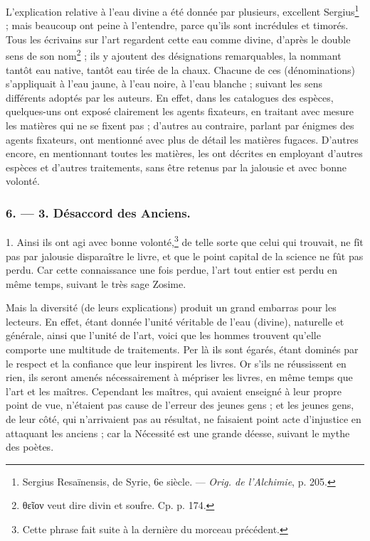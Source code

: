 \documentclass[a4paper, 11pt, oneside, polutonikogreek, french]{article}
\begin{document}
L'explication relative à l'eau divine a été donnée par plusieurs, excellent Sergius\footnote{Sergius Resaïnensis, de Syrie, 6e siècle. --- \emph{Orig. de l'Alchimie}, p. 205.} ; mais beaucoup ont peine à l'entendre, parce qu'ils sont incrédules et timorés. Tous les écrivains sur l'art regardent cette eau comme divine, d'après le double sens de son nom\footnote{θεῖον veut dire divin et soufre. Cp. p. 174.} ; ils y ajoutent des désignations remarquables, la nommant tantôt eau native, tantôt eau tirée de la chaux. Chacune de ces (dénominations) s'appliquait à l'eau jaune, à l'eau noire, à l'eau blanche ; suivant les sens différents adoptés par les auteurs. En effet, dans les catalogues des espèces, quelques-uns ont exposé clairement les agents fixateurs, en traitant avec mesure les matières qui ne se fixent pas ; d'autres au contraire, parlant par énigmes des agents fixateurs, ont mentionné avec plus de détail les matières fugaces. D'autres encore, en mentionnant toutes les matières, les ont décrites en employant d'autres espèces et d'autres traitements, sans être retenus par la jalousie et avec bonne volonté.

\bigskip
\centerline{\EightStarTaper}
\centerline{\EightStarTaper\EightStarTaper}
\bigskip

\subsubsection{6. --- 3. Désaccord des Anciens.}

1. Ainsi ils ont agi avec bonne volonté,\footnote{Cette phrase fait suite à la dernière du morceau précédent.} de telle sorte que celui qui trouvait, ne fît pas par jalousie disparaître le livre, et que le point capital de la science ne fût pas perdu. Car cette connaissance une fois perdue, l'art tout entier est perdu en même temps, suivant le très sage Zosime.

Mais la diversité (de leurs explications) produit un grand embarras pour les lecteurs. En effet, étant donnée l'unité véritable de l'eau (divine), naturelle et générale, ainsi que l'unité de l'art, voici que les hommes trouvent qu'elle comporte une multitude de traitements. Per là ils sont égarés, étant dominés par le respect et la confiance que leur inspirent les livres. Or s'ils ne réussissent en rien, ils seront amenés nécessairement à mépriser les livres, en même temps que l'art et les maîtres. Cependant les maîtres, qui avaient enseigné à leur propre point de vue, n'étaient pas cause de l'erreur des jeunes gens ; et les jeunes gens, de leur côté, qui n'arrivaient pas au résultat, ne faisaient point acte d'injustice en attaquant les anciens ; car la Nécessité est une grande déesse, suivant le mythe des poètes.
\end{document}
